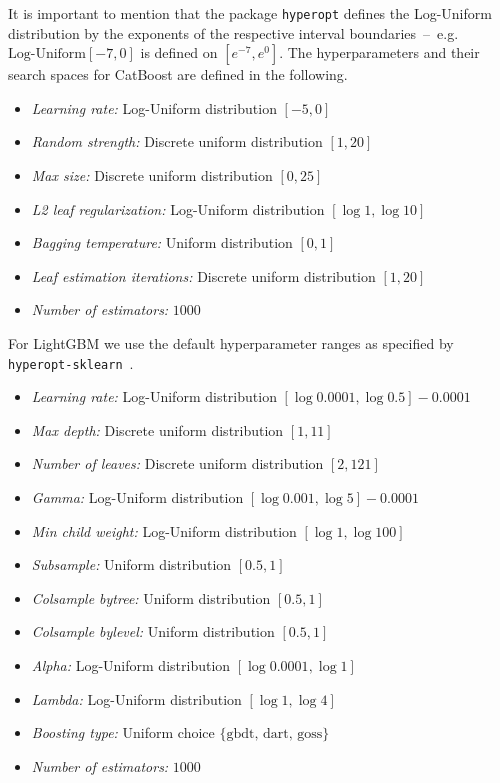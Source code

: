 \documentclass{article}
\theoremstyle{plain}
\theoremstyle{definition}
\theoremstyle{remark}
\begin{document}
It is important to mention that the package \texttt{hyperopt}
defines the Log-Uniform distribution by the
exponents of the respective interval boundaries~\---{}~e.g. 
$\text{Log-Uniform}[-7, 0]$ is defined on $[e^{-7}, e^0]$.
The hyperparameters and their search spaces for CatBoost are defined in the following.
\begin{itemize}
    \item \textit{Learning rate:} Log-Uniform distribution $[-5, 0]$
    \item \textit{Random strength:} Discrete uniform distribution $[1, 20]$
    \item \textit{Max size:} Discrete uniform distribution $[0, 25]$
    \item \textit{L2 leaf regularization:} Log-Uniform distribution $[ \log1, \log10 ]$
    \item \textit{Bagging temperature:} Uniform distribution $[0, 1]$
    \item \textit{Leaf estimation iterations:} Discrete uniform distribution $[1, 20]$
    \item \textit{Number of estimators:} $1000$
\end{itemize}
For LightGBM we use the default hyperparameter ranges as specified by \texttt{hyperopt-sklearn}~\citep{Komer:14}.
\begin{itemize}
    \item \textit{Learning rate:} Log-Uniform distribution $[\log 0.0001, \log 0.5] - 0.0001$
    \item \textit{Max depth:} Discrete uniform distribution $[1, 11]$
    \item \textit{Number of leaves:} Discrete uniform distribution $[2, 121]$
    \item \textit{Gamma:} Log-Uniform distribution $[\log 0.001, \log 5] - 0.0001$
    \item \textit{Min child weight:} Log-Uniform distribution $[\log 1, \log 100]$
    \item \textit{Subsample:} Uniform distribution $[0.5, 1]$
    \item \textit{Colsample bytree:} Uniform distribution $[0.5, 1]$
    \item \textit{Colsample bylevel:} Uniform distribution $[0.5, 1]$
    \item \textit{Alpha:} Log-Uniform distribution $[\log 0.0001, \log 1]$
    \item \textit{Lambda:} Log-Uniform distribution $[\log 1, \log 4]$
    \item \textit{Boosting type:} Uniform choice $\{ \text{gbdt, dart, goss}\}$
    \item \textit{Number of estimators:} $1000$
\end{itemize}
\end{document}
